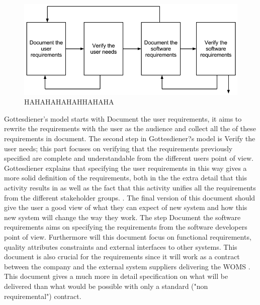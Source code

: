 \documentclass[a4paper]{article}
\begin{document}
\begin{figure}[!ht]
	\centering
		\includegraphics[width=1\textwidth]{images/specifications_model.png}
	\caption{HAHAHAHAHAHHAHAHA}
	\label{figure:specifications}
\end{figure}

Gottesdiener's model starts with Document the user requirements, it aims to rewrite the requirements with the user as the audience and collect all the of these requirements in document. The second step in Gottesdiener?s model is Verify the user needs; this part focuses on verifying that the requirements previously specified are complete and understandable from the different users point of view. Gottesdiener explains that specifying the user requirements in this way gives a more solid definition of the requirements, both in the the extra detail that this activity results in as well as the fact that this activity unifies all the requirements from the different stakeholder groups. \cite{gott234}. The final version of this document should give the user a good view of what they can expect of new system and how this new system will change the way they work\cite{gott235}. The step Document the software requirements aims on specifying the requirements from the software developers point of view. Furthermore will this document focus on functional requirements, quality attributes constraints and external interfaces to other systems\cite{gott238}. This document is also crucial for the requirements since it will work as a contract between the company and the external system suppliers delivering the WOMS \cite{gott238}. This document gives a much more in detail specification on what will be delivered than what would be possible with only a standard ("non requiremental") contract. 
\end{document}
